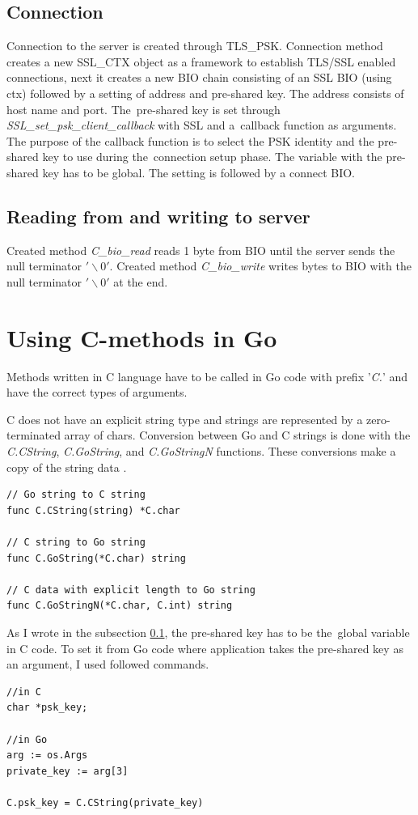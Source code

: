 \documentclass[
  oneside, 12pt, 
  printed, %
  notable,   %
  nolof,     %
  nolot,     %
]{fithesis3}
\begin{document}
\subsection{Connection}\label{conn}
Connection to the server is created through TLS\_PSK. Connection method creates a new SSL\_CTX 
object as a framework to establish TLS/SSL enabled connections, next it creates a new BIO chain 
consisting of an SSL BIO (using ctx) followed by a setting of address and pre-shared key. The 
address consists of host name and port. The~pre-shared key is set through 
\textit{SSL\_set\_psk\_client\_callback} with SSL and a~callback function as arguments. The 
purpose of the callback function is to select the PSK identity and the pre-shared key to use 
during the~connection setup phase. The variable with the pre-shared key has to be global. The 
setting is followed by a connect BIO.

\subsection{Reading from and writing to server}
Created method \textit{C\_bio\_read} reads 1 byte from BIO until the server sends the null 
terminator $'\backslash0'$. Created method \textit{C\_bio\_write} writes bytes to BIO with the 
null terminator $'\backslash0'$ at the end.

\section{Using C-methods in Go}\label{c-method}
Methods written in C language have to be called in Go code with prefix '\textit{C.}' and have the 
correct types of arguments. 

C does not have an explicit string type and strings are represented by 
a zero-terminated array of chars. Conversion between Go and C strings is done with the 
\textit{C.CString}, \textit{C.GoString}, and \textit{C.GoStringN} functions. These conversions 
make a copy of the string data \cite{bloggolangorg}. 

\begin{lstlisting}
// Go string to C string
func C.CString(string) *C.char

// C string to Go string
func C.GoString(*C.char) string

// C data with explicit length to Go string
func C.GoStringN(*C.char, C.int) string
\end{lstlisting}

As I wrote in the subsection \ref{conn}, the pre-shared key has to be the~global variable in C 
code. To set it from Go code where application takes the pre-shared key as an argument, I used 
followed commands.
\begin{lstlisting}
//in C
char *psk_key;

//in Go
arg := os.Args
private_key := arg[3]

C.psk_key = C.CString(private_key)
\end{lstlisting}
\end{document}
